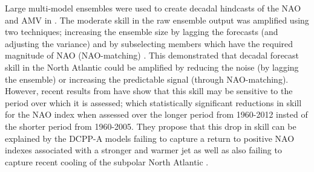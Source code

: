 \documentclass{article}
\begin{document}
Large multi-model ensembles were used to create decadal hindcasts of the NAO and AMV in \cite{smith2020north}. The moderate skill in the raw ensemble output was amplified using two techniques; increasing the ensemble size by lagging the forecasts (and adjusting the variance) and by subselecting members which have the required magnitude of NAO (NAO-matching) \parencite{smith2020north}. This demonstrated that decadal forecast skill in the North Atlantic could be amplified by reducing the noise (by lagging the ensemble) or increasing the predictable signal (through NAO-matching). However, recent results from \cite{marcheggiani2023decadal} have show that this skill may be sensitive to the period over which it is assessed; which statistically significant reductions in skill for the NAO index when assessed over the longer period from 1960-2012 insted of the shorter period from 1960-2005. They propose that this drop in skill can be explained by the DCPP-A models failing to capture a return to positive NAO indexes associated with a stronger and warmer jet as well as also failing to capture recent cooling of the subpolar North Atlantic \parencite{marcheggiani2023decadal}.\\
\end{document}
